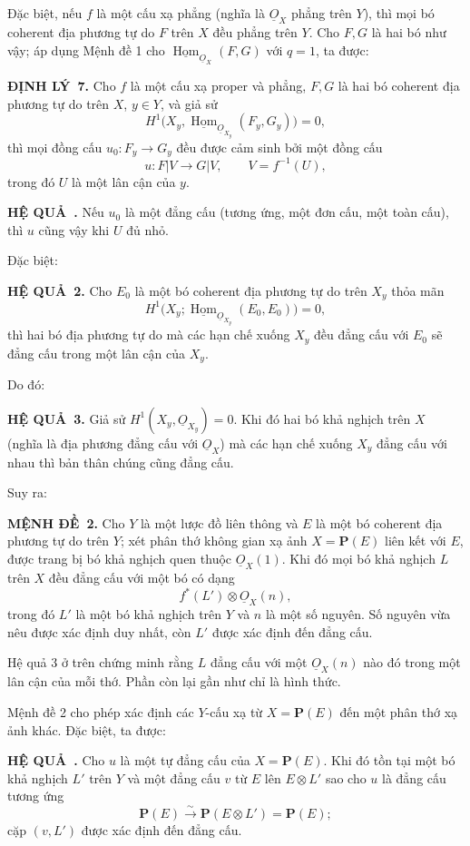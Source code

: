 \documentclass[11pt,twoside,openany]{book}
\numberwithin{equation}{section}
\newcommand{\src}[1]{%
  \phantomsection\hypertarget{src:\fgasourceid:#1}{}%
  \marginpar{\raggedleft\footnotesize\sffamily #1}%
}
\newcommand{\fgasourceid}{unset}
\newcommand{\Osh}{\underline{O}}
\newcommand{\Homsh}{\underline{\operatorname{Hom}}}
\newcommand{\result}[2]{\par\medskip\noindent\textbf{#1\if\relax\detokenize{#2}\relax\else\ #2\fi.}\quad}
\begin{document}
Đặc biệt, nếu $f$ là một cấu xạ phẳng (nghĩa là $\Osh_X$ phẳng trên $Y$), thì
mọi bó coherent địa phương tự do $F$ trên $X$ đều phẳng trên $Y$. Cho $F,G$ là
hai bó như vậy; áp dụng Mệnh đề 1 cho $\Homsh_{\Osh_X}(F,G)$ với $q=1$, ta
được:

\result{ĐỊNH LÝ}{7} Cho $f$ là một cấu xạ proper và phẳng, $F,G$ là hai bó
coherent địa phương tự do trên $X$, $y\in Y$, và giả sử
\[
  H^1\bigl(X_y,\Homsh_{\Osh_{X_y}}(F_y,G_y)\bigr)=0,
\]
thì mọi đồng cấu $u_0:F_y\longrightarrow G_y$ đều được cảm sinh bởi một đồng
cấu
\[
  u:F|V\longrightarrow G|V,
  \qquad V=f^{-1}(U),
\]
trong đó $U$ là một lân cận của $y$.

\result{HỆ QUẢ}{} Nếu $u_0$ là một đẳng cấu (tương ứng, một đơn cấu, một toàn
cấu), thì $u$ cũng vậy khi $U$ đủ nhỏ.

Đặc biệt:

\src{202}
\result{HỆ QUẢ}{2} Cho $E_0$ là một bó coherent địa phương tự do trên $X_y$
thỏa mãn
\[
  H^1\bigl(X_y;\Homsh_{\Osh_{X_y}}(E_0,E_0)\bigr)=0,
\]
thì hai bó địa phương tự do mà các hạn chế xuống $X_y$ đều đẳng cấu
với $E_0$ sẽ đẳng cấu trong một lân cận của $X_y$.

Do đó:

\result{HỆ QUẢ}{3} Giả sử $H^1(X_y,\Osh_{X_y})=0$. Khi đó hai bó khả nghịch
trên $X$ (nghĩa là địa phương đẳng cấu với $\Osh_X$) mà các hạn chế xuống
$X_y$ đẳng cấu với nhau thì bản thân chúng cũng đẳng cấu.

Suy ra:

\result{MỆNH ĐỀ}{2} Cho $Y$ là một lược đồ liên thông và $E$ là một bó
coherent địa phương tự do trên $Y$; xét phân thớ không gian xạ ảnh
$X=\mathbf P(E)$ liên kết với $E$, được trang bị bó khả nghịch quen thuộc
$\Osh_X(1)$. Khi đó mọi bó khả nghịch $L$ trên $X$ đều đẳng cấu với một bó có
dạng
\[
  f^*(L')\otimes\Osh_X(n),
\]
trong đó $L'$ là một bó khả nghịch trên $Y$ và $n$ là một số nguyên. Số nguyên
vừa nêu được xác định duy nhất, còn $L'$ được xác định đến đẳng cấu.

Hệ quả 3 ở trên chứng minh rằng $L$ đẳng cấu với một $\Osh_X(n)$ nào đó trong
một lân cận của mỗi thớ. Phần còn lại gần như chỉ là hình thức.

Mệnh đề 2 cho phép xác định các $Y$-cấu xạ từ $X=\mathbf P(E)$ đến một phân
thớ xạ ảnh khác. Đặc biệt, ta được:

\result{HỆ QUẢ}{} Cho $u$ là một tự đẳng cấu của $X=\mathbf P(E)$. Khi đó tồn
tại một bó khả nghịch $L'$ trên $Y$ và một đẳng cấu $v$ từ $E$ lên
$E\otimes L'$ sao cho $u$ là đẳng cấu tương ứng
\[
  \mathbf P(E)\xrightarrow{\sim}\mathbf P(E\otimes L')=\mathbf P(E);
\]
cặp $(v,L')$ được xác định đến đẳng cấu.
\end{document}
